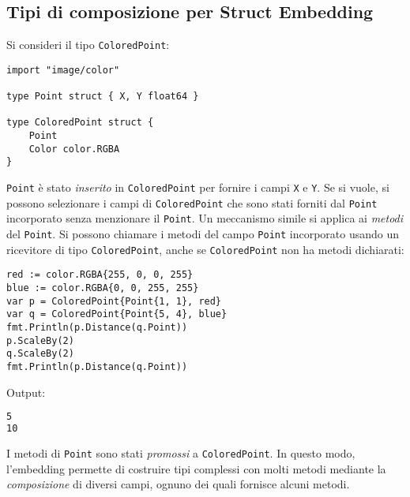 \documentclass[../../thesis.tex]{subfiles}
\begin{document}
    \subsection{Tipi di composizione per Struct Embedding}\label{subsec:tipi-di-composizione-per-struct-embedding}
    Si consideri il tipo \verb"ColoredPoint":
    \begin{lstlisting}[frame = single,label={lst:lstlisting5-3.1}]
import "image/color"

type Point struct { X, Y float64 }

type ColoredPoint struct {
    Point
    Color color.RGBA
}
    \end{lstlisting}
    \verb"Point" è stato \textit{inserito} in \verb"ColoredPoint" per fornire i campi \verb"X" e \verb"Y".
    Se si vuole, si possono selezionare i campi di \verb"ColoredPoint" che sono stati forniti dal \verb"Point" incorporato senza menzionare il \verb"Point".
    Un meccanismo simile si applica ai \textit{metodi} del \verb"Point".
    Si possono chiamare i metodi del campo \verb"Point" incorporato usando un ricevitore di tipo \verb"ColoredPoint", anche se \verb"ColoredPoint" non ha metodi dichiarati:
    \begin{lstlisting}[frame = single,label={lst:lstlisting5-3.2}]
red := color.RGBA{255, 0, 0, 255}
blue := color.RGBA{0, 0, 255, 255}
var p = ColoredPoint{Point{1, 1}, red}
var q = ColoredPoint{Point{5, 4}, blue}
fmt.Println(p.Distance(q.Point))
p.ScaleBy(2)
q.ScaleBy(2)
fmt.Println(p.Distance(q.Point))
    \end{lstlisting}
    Output:
    \begin{lstlisting}[language = bash, frame = L,label={lst:lstlisting5-3.3}]
5
10
    \end{lstlisting}
    I metodi di \verb"Point" sono stati \textit{promossi} a \verb"ColoredPoint".
    In questo modo, l'embedding permette di costruire tipi complessi con molti metodi mediante la \textit{composizione} di diversi campi, ognuno dei quali fornisce alcuni metodi.
    \hfill \vspace{12pt}
\end{document}

